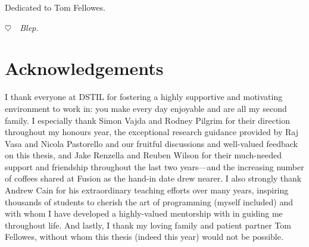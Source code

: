 \cleardoublepage
\pagestyle{empty}
\begin{center}
  \vspace*{0.3\paperheight}
  Dedicated to Tom Fellowes.
  
  {\color{white} \itshape $\heartsuit$~~Blep.}
\end{center}
\pagestyle{fancy}

\chapter*{Acknowledgements}

I thank everyone at DSTIL for fostering a highly supportive and motivating environment to work in: you make every day enjoyable and are all my second family. I especially thank Simon Vajda and Rodney Pilgrim for their direction throughout my honours year, the exceptional research guidance provided by Raj Vasa and Nicola Pastorello and our fruitful discussions and well-valued feedback on this thesis, and Jake Renzella and Reuben Wilson for their much-needed support and friendship throughout the last two years---and the increasing number of coffees shared at Fusion as the hand-in date drew nearer. I also strongly thank Andrew Cain for his extraordinary teaching efforts over many years, inspiring thousands of students to cherish the art of programming (myself included) and with whom I have developed a highly-valued mentorship with in guiding me throughout life. And lastly, I thank my loving family and patient partner Tom Fellowes, without whom this thesis (indeed this year) would not be possible.